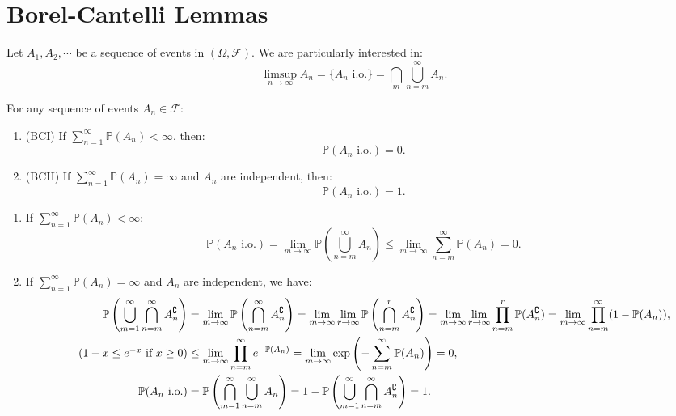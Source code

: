 \documentclass{huhtakm-template-book-v2}
\newcommand{\prob}{\mathbb{P}}
\begin{document}
\section{Borel-Cantelli Lemmas}
    Let $A_{1},A_{2},\cdots$ be a sequence of events in $(\Omega,\mathcal{F})$. We are particularly interested in:
    \begin{equation*}
        \limsup_{n \to \infty}A_{n} = \{A_{n}\text{ i.o.}\} = \bigcap_{m}\bigcup_{n = m}^{\infty} A_{n}.
    \end{equation*}
    \begin{thm}
        For any sequence of events $A_{n} \in \mathcal{F}$:
        \begin{enumerate}
            \item (BCI) If $\sum_{n = 1}^{\infty}\prob(A_{n}) < \infty$, then:
            \begin{equation*}
                \prob(A_{n}\text{ i.o.}) = 0.
            \end{equation*}
            \item (BCII) If $\sum_{n = 1}^{\infty}\prob(A_{n}) = \infty$ and $A_{n}$ are independent, then:
            \begin{equation*}
                \prob(A_{n}\text{ i.o.}) = 1.
            \end{equation*}
        \end{enumerate}
    \end{thm}
    \begin{proofing}
        \begin{enumerate}
            \item If $\sum_{n = 1}^{\infty}\prob(A_{n}) < \infty$:
            \begin{equation*}
                \prob(A_{n}\text{ i.o.}) = \lim_{m \to \infty}\prob\left(\bigcup_{n = m}^{\infty}A_{n}\right) \leq \lim_{m \to \infty}\sum_{n = m}^{\infty}\prob(A_{n}) = 0.
            \end{equation*}
            \item If $\sum_{n = 1}^{\infty}\prob(A_{n}) = \infty$ and $A_{n}$ are independent, we have:
            \begin{align*}
                \prob\left(\bigcup_{m = 1}^{\infty}\bigcap_{n = m}^{\infty}A_{n}^{\complement}\right) &= \lim_{m \to \infty}\prob\left(\bigcap_{n = m}^{\infty}A_{n}^{\complement}\right) = \lim_{m \to \infty}\lim_{r \to \infty}\prob\left(\bigcap_{n = m}^{r}A_{n}^{\complement}\right) = \lim_{m \to \infty}\lim_{r \to \infty}\prod_{n = m}^{r}\prob(A_{n}^{\complement}) = \lim_{m \to \infty}\prod_{n = m}^{\infty}(1-\prob(A_{n})),\\
                \tag{$1-x \leq e^{-x}$ if $x \geq 0$}
                &\leq \lim_{m \to \infty}\prod_{n = m}^{\infty}e^{-\prob(A_{n})} = \lim_{m \to \infty}\exp\left(-\sum_{n = m}^{\infty}\prob(A_{n})\right) = 0,\\
                \prob(A_{n}\text{ i.o.}) &= \prob\left(\bigcap_{m = 1}^{\infty}\bigcup_{n = m}^{\infty}A_{n}\right) = 1-\prob\left(\bigcup_{m = 1}^{\infty}\bigcap_{n = m}^{\infty}A_{n}^{\complement}\right) = 1.
            \end{align*}
        \end{enumerate}
    \end{proofing}
\end{document}
